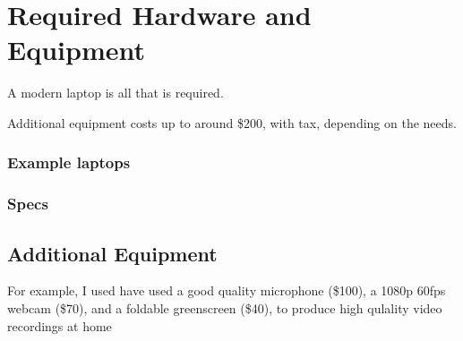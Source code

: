 \documentclass[sigconf]{acmart}
\begin{document}
\section{Required Hardware and Equipment}
A modern laptop is all that is required.

Additional equipment costs up to around \$200, with tax, depending on the needs.

\subsubsection{Example laptops}
\subsubsection{Specs}






\subsection{Additional Equipment}

For example, I used have used a good quality microphone (\$100), a 1080p 60fps webcam (\$70), and a foldable greenscreen (\$40), to produce high qulality video recordings at home
\end{document}
